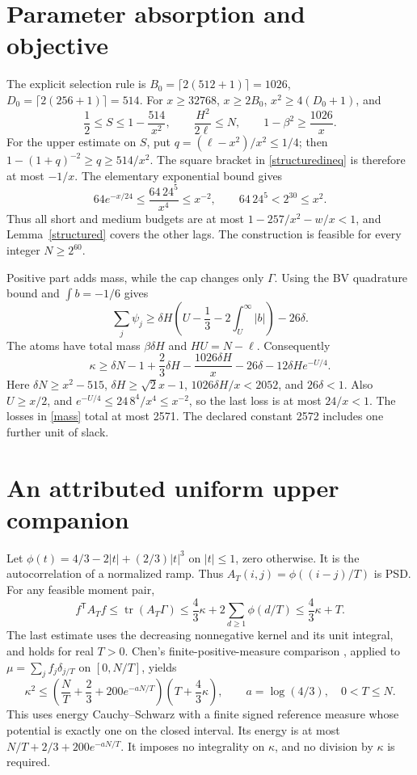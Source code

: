 \section{Parameter absorption and objective}
The explicit selection rule is
\(B_0=\lceil2(512+1)\rceil=1026\),
\(D_0=\lceil2(256+1)\rceil=514\).
For \(x\ge32768\), \(x\ge2B_0\), \(x^2\ge4(D_0+1)\), and
\[
 \frac12\le S\le1-\frac{514}{x^2},\qquad
 \frac{H^2}{2\ell}\le N,\qquad 1-\beta^2\ge\frac{1026}{x}.
\]
For the upper estimate on \(S\), put
\(q=(\ell-x^2)/x^2\le1/4\); then
\(1-(1+q)^{-2}\ge q\ge514/x^2\).
The square bracket in \eqref{structuredineq} is therefore at most \(-1/x\).
The elementary exponential bound gives
\[
 64e^{-x/24}\le\frac{64\,24^5}{x^4}\le x^{-2},
 \qquad 64\,24^5<2^{30}\le x^2.
\]
Thus all short and medium budgets are at most
\(1-257/x^2-w/x<1\), and Lemma~\ref{structured} covers the other lags.
The construction is feasible for every integer \(N\ge2^{60}\).

Positive part adds mass, while the cap changes only \(\Gamma\).
Using the BV quadrature bound and \(\int b=-1/6\) gives
\[
 \sum_j\psi_j\ge\delta H
 \left(U-\frac13-2\int_U^\infty|b|\right)-26\delta.
\]
The atoms have total mass \(\beta\delta H\) and \(HU=N-\ell\).
Consequently
\begin{equation}
 \kappa\ge\delta N-1+\frac23\delta H
 -\frac{1026\delta H}{x}-26\delta-12\delta H e^{-U/4}. \label{mass}
\end{equation}
Here \(\delta N\ge x^2-515\),
\(\delta H\ge\sqrt2x-1\),
\(1026\delta H/x<2052\), and \(26\delta<1\).
Also \(U\ge x/2\), and
\(e^{-U/4}\le24\,8^4/x^4\le x^{-2}\), so the last loss is at most
\(24/x<1\). The losses in \eqref{mass} total at most 2571.
The declared constant 2572 includes one further unit of slack.

\section{An attributed uniform upper companion}
Let \(\phi(t)=4/3-2|t|+(2/3)|t|^3\) on \(|t|\le1\), zero otherwise.
It is the autocorrelation of a normalized ramp. Thus
\(A_T(i,j)=\phi((i-j)/T)\) is PSD. For any feasible moment pair,
\[
 f^{\mathsf T}A_T f\le\operatorname{tr}(A_T\Gamma)
 \le\frac43\kappa+2\sum_{d\ge1}\phi(d/T)\le\frac43\kappa+T.
\]
The last estimate uses the decreasing nonnegative kernel and its unit
integral, and holds for real \(T>0\).
Chen's finite-positive-measure comparison \cite[Lemma 4.4]{chen}, applied to
\(\mu=\sum_j f_j\delta_{j/T}\) on \([0,N/T]\), yields
\begin{equation}
 \kappa^2\le\left(\frac NT+\frac23+200e^{-aN/T}\right)
 \left(T+\frac43\kappa\right),\qquad a=\log(4/3),\quad 0<T\le N.
 \label{upper}
\end{equation}
This uses energy Cauchy--Schwarz with a finite signed reference measure
whose potential is exactly one on the closed interval. Its energy is at most
\(N/T+2/3+200e^{-aN/T}\). It imposes no integrality on \(\kappa\), and
no division by \(\kappa\) is required.

